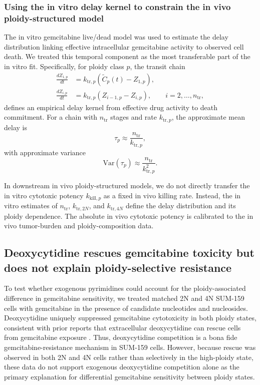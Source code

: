 \documentclass[11pt,notitlepage]{article}
\begin{document}
\clearpage
\color{blue}
\subsubsection{Using the in vitro delay kernel to constrain the in vivo ploidy-structured model}

The in vitro gemcitabine live/dead model was used to estimate the delay distribution linking effective intracellular gemcitabine activity to observed cell death. We treated this temporal component as the most transferable part of the in vitro fit. Specifically, for ploidy class \(p\), the transit chain
\begin{align}
\frac{dZ_{1,p}}{dt}
&=
k_{\mathrm{tr},p}
\left(
\widetilde C_p(t)-Z_{1,p}
\right),\\
\frac{dZ_{i,p}}{dt}
&=
k_{\mathrm{tr},p}
\left(
Z_{i-1,p}-Z_{i,p}
\right),
\qquad i=2,\ldots,n_{\mathrm{tr}},
\end{align}
defines an empirical delay kernel from effective drug activity to death commitment. For a chain with \(n_{\mathrm{tr}}\) stages and rate \(k_{\mathrm{tr},p}\), the approximate mean delay is
\begin{equation}
\tau_p \approx \frac{n_{\mathrm{tr}}}{k_{\mathrm{tr},p}},
\end{equation}
with approximate variance
\begin{equation}
\mathrm{Var}(\tau_p) \approx \frac{n_{\mathrm{tr}}}{k_{\mathrm{tr},p}^2}.
\end{equation}

In downstream in vivo ploidy-structured models, we do not directly transfer the in vitro cytotoxic potency \(k_{\mathrm{kill},p}\) as a fixed in vivo killing rate. Instead, the in vitro estimates of \(n_{\mathrm{tr}}\), \(k_{\mathrm{tr},2N}\), and \(k_{\mathrm{tr},4N}\) define the delay distribution and its ploidy dependence. The absolute in vivo cytotoxic potency is calibrated to the in vivo tumor-burden and ploidy-composition data.




\subsection{Deoxycytidine rescues gemcitabine toxicity but does not explain ploidy-selective resistance}\label{supp:deoxycytidine}

To test whether exogenous pyrimidines could account for the ploidy-associated difference in gemcitabine sensitivity, we treated matched 2N and 4N SUM-159 cells with gemcitabine in the presence of candidate nucleotides and nucleosides. Deoxycytidine uniquely suppressed gemcitabine cytotoxicity in both ploidy states, consistent with prior reports that extracellular deoxycytidine can rescue cells from gemcitabine exposure \cite{https://pmc.ncbi.nlm.nih.gov/articles/PMC7357734}. Thus, deoxycytidine competition is a bona fide gemcitabine-resistance mechanism in SUM-159 cells. However, because rescue was observed in both 2N and 4N cells rather than selectively in the high-ploidy state, these data do not support exogenous deoxycytidine competition alone as the primary explanation for differential gemcitabine sensitivity between ploidy states.
\end{document}
